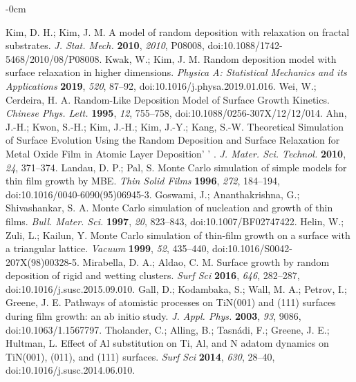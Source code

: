 \documentclass[journal,article,submit,pdftex,moreauthors]{Definitions/mdpi}
\begin{document}
\begin{adjustwidth}{-\extralength}{0cm}
\begin{thebibliography}{999}
Kim, D. H.; Kim, J. M. A model of random deposition with relaxation on fractal substrates. \textit{J. Stat. Mech.} \textbf{2010}, \textit{2010}, P08008, doi:10.1088/1742-5468/2010/08/P08008.
Kwak, W.; Kim, J. M. Random deposition model with surface relaxation in higher dimensions. \textit{Physica A: Statistical Mechanics and its Applications} \textbf{2019}, \textit{520}, 87–92, doi:10.1016/j.physa.2019.01.016.
Wei, W.; Cerdeira, H. A. Random-Like Deposition Model of Surface Growth Kinetics. \textit{Chinese Phys. Lett.} \textbf{1995}, \textit{12}, 755–758, doi:10.1088/0256-307X/12/12/014.
Ahn, J.-H.; Kwon, S.-H.; Kim, J.-H.; Kim, J.-Y.; Kang, S.-W. Theoretical Simulation of Surface Evolution Using the Random Deposition and Surface Relaxation for Metal Oxide Film in Atomic Layer Deposition' ' . \textit{J. Mater. Sci. Technol.} \textbf{2010}, \textit{24}, 371–374.
Landau, D. P.; Pal, S. Monte Carlo simulation of simple models for thin film growth by MBE. \textit{Thin Solid Films} \textbf{1996}, \textit{272}, 184–194, doi:10.1016/0040-6090(95)06945-3.
Goswami, J.; Ananthakrishna, G.; Shivashankar, S. A. Monte Carlo simulation of nucleation and growth of thin films. \textit{Bull. Mater. Sci.} \textbf{1997}, \textit{20}, 823–843, doi:10.1007/BF02747422.
Helin, W.; Zuli, L.; Kailun, Y. Monte Carlo simulation of thin-film growth on a surface with a triangular lattice. \textit{Vacuum} \textbf{1999}, \textit{52}, 435–440, doi:10.1016/S0042-207X(98)00328-5.
Mirabella, D. A.; Aldao, C. M. Surface growth by random deposition of rigid and wetting clusters. \textit{Surf Sci} \textbf{2016}, \textit{646}, 282–287, doi:10.1016/j.susc.2015.09.010.
Gall, D.; Kodambaka, S.; Wall, M. A.; Petrov, I.; Greene, J. E. Pathways of atomistic processes on TiN(001) and (111) surfaces during film growth: an ab initio study. \textit{J. Appl. Phys.} \textbf{2003}, \textit{93}, 9086, doi:10.1063/1.1567797.
Tholander, C.; Alling, B.; Tasnádi, F.; Greene, J. E.; Hultman, L. Effect of Al substitution on Ti, Al, and N adatom dynamics on TiN(001), (011), and (111) surfaces. \textit{Surf Sci} \textbf{2014}, \textit{630}, 28–40, doi:10.1016/j.susc.2014.06.010.

\end{thebibliography}
\end{adjustwidth}
\end{document}

